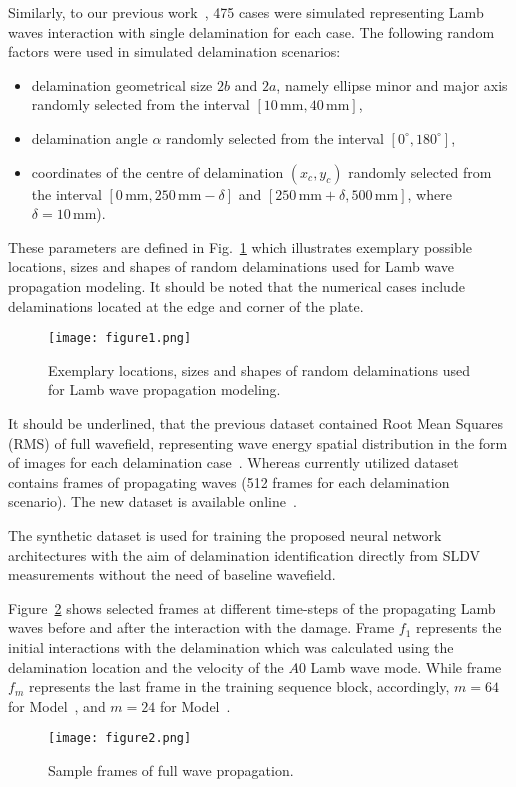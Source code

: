Similarly, to our previous work~\cite{Ijjeh2021}, 475 cases were simulated representing Lamb waves interaction with single delamination for each case. 
The following random factors were used in simulated delamination scenarios:
\begin{itemize}
	\item delamination geometrical size	\(2b\) and \(2a\), namely ellipse minor and major axis randomly selected from the interval \(\left[10 \, \textrm{mm}, 40\, \textrm{mm}\right]\),
	\item delamination angle \(\alpha\) randomly selected from the interval \( \left[ 0^{\circ}, 180^{\circ} \right]\),
	\item coordinates of the centre of delamination \((x_c,y_c)\) randomly selected from the interval \(\left[0\, \textrm{mm}, 250\, \textrm{mm} -\delta \right]\) and \( \left[250\, \textrm{mm}+\delta, 500\, \textrm{mm} \right] \), where \(\delta = 10\, \textrm{mm}\)).
\end{itemize}
These parameters are defined in Fig.~\ref{fig:random_delaminations} which illustrates exemplary possible locations, sizes and shapes of random delaminations used for Lamb wave propagation modeling.
It should be noted that the numerical cases include delaminations located at the edge and corner of the plate.
\begin{figure}[!h]
	\centering
	\texttt{[image: figure1.png]}
	\caption{Exemplary locations, sizes and shapes of random delaminations used for Lamb wave propagation modeling.}
	\label{fig:random_delaminations}
\end{figure}

It should be underlined, that the previous dataset contained Root Mean Squares (RMS) of full wavefield, representing wave energy spatial distribution in the form of images for each delamination case~\cite{Kudela2020d}. 
Whereas currently utilized dataset contains frames of propagating waves (512 frames for each delamination scenario). 
The new dataset is available online~\cite{kudela_pawel_2021_5414555}.

The synthetic dataset is used for training the proposed neural network architectures with the aim of delamination identification directly from SLDV measurements without the need of baseline wavefield.

Figure~\ref{fig:Full_wave} shows selected frames at different time-steps of the propagating Lamb waves before and after the interaction with the damage.
Frame \(f_{1}\) represents the initial interactions with the delamination which was calculated using the delamination location and the velocity of the \(A0\) Lamb wave mode.
While frame \(f_{m}\) represents the last frame in the training sequence block, accordingly, \(m=64\) for Model~, and \(m=24\) for Model~.
\begin{figure}[!h]
	\centering
	\texttt{[image: figure2.png]}
	\caption{Sample frames of full wave propagation.}
	\label{fig:Full_wave}
\end{figure}

